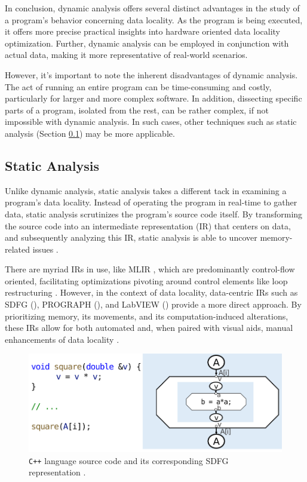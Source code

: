 In conclusion, dynamic analysis offers several distinct advantages in the study of a program's behavior concerning data locality. As the program is being executed, it offers more precise practical insights into hardware oriented data locality optimization. Further, dynamic analysis can be employed in conjunction with actual data, making it more representative of real-world scenarios.

However, it's important to note the inherent disadvantages of dynamic analysis. The act of running an entire program can be time-consuming and costly, particularly for larger and more complex software. In addition, dissecting specific parts of a program, isolated from the rest, can be rather complex, if not impossible with dynamic analysis. In such cases, other techniques such as static analysis (Section \ref{sec:static_analysis}) may be more applicable.

\subsection{Static Analysis}\label{sec:static_analysis}

Unlike dynamic analysis, static analysis takes a different tack in examining a program's data locality. Instead of operating the program in real-time to gather data, static analysis scrutinizes the program's source code itself. By transforming the source code into an intermediate representation (IR) that centers on data, and subsequently analyzing this IR, static analysis is able to uncover memory-related issues \cite{schaad2022boosting,schaad2021boosting,calotoiu2022lifting,ben2023bridging}.

There are myriad IRs in use, like MLIR \cite{lattner2020mlir}, which are predominantly control-flow oriented, facilitating optimizations pivoting around control elements like loop restructuring \cite{moses2021polygeist}. However, in the context of data locality, data-centric IRs such as SDFG (\cite{ben2019statefulSDFG}), PROGRAPH (\cite{matwin1985prograph}), and LabVIEW (\cite{kodosky2020labview}) provide a more direct approach. By prioritizing memory, its movements, and its computation-induced alterations, these IRs allow for both automated \cite{ben2019statefulSDFG} and, when paired with visual aids, manual enhancements of data locality \cite{ben2023bridging,ben2019statefulSDFG,schaad2021boosting}.

\begin{figure}
  \centering
  \includegraphics[width=\linewidth]{pictures/SDFG.png}
  \caption{\texttt{C++} language source code and its corresponding SDFG representation \cite{calotoiu2022lifting}.}
  \label{fig:sdfg}
\end{figure}

